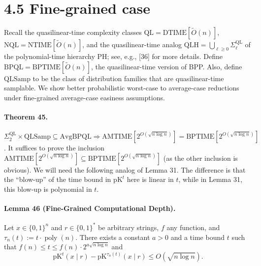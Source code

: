 \documentclass[10pt,a4paper]{article}
\begin{document}
\section*{4.5 Fine-grained case}
Recall the quasilinear-time complexity classes $\mathrm{QL}=\mathrm{DTIME}[\widetilde O(n)]$, $\mathrm{NQL}=\mathrm{NTIME}[\widetilde O(n)]$, and the quasilinear-time analog $\mathrm{QLH}=\bigcup_{\ell\geq0}\Sigma_\ell^{\mathrm{QL}}$ of the polynomial-time hierarchy PH; see, e.g., [36] for more details. Define $\mathrm{BPQL}=\mathrm{BPTIME}[\widetilde O(n)]$, the quasilinear-time version of BPP. Also, define $\mathrm{QLSamp}$ to be the class of distribution families that are quasilinear-time samplable. We show better probabilistic worst-case to average-case reductions under fine-grained average-case easiness assumptions.
\paragraph{Theorem 45.} $\Sigma_2^{\mathrm{QL}}\times\mathrm{QLSamp}\subseteq\mathrm{AvgBPQL}\Longrightarrow\mathrm{AMTIME}[2^{O(\sqrt{n\log n})}]=\mathrm{BPTIME}[2^{O(\sqrt{n\log n})}]$.
It suffices to prove the inclusion $\mathrm{AMTIME}[2^{O(\sqrt{n\log n})}]\subseteq\mathrm{BPTIME}[2^{O(\sqrt{n\log n})}]$ (as the other inclusion is obvious). We will need the following analog of Lemma 31. The difference is that the ``blow-up'' of the time bound in $\mathrm{pK}^t$ here is linear in $t$, while in Lemma 31, this blow-up is polynomial in $t$.
\paragraph{Lemma 46 (Fine-Grained Computational Depth).} Let $x\in\{0,1\}^n$ and $r\in\{0,1\}^*$ be arbitrary strings, $f$ any function, and $\tau_n(t):=t\cdot\operatorname{poly}(n)$. There exists a constant $a>0$ and a time bound $t$ such that $f(n)\leq t\leq f(n)\cdot2^{a\sqrt{n\log n}}$ and
\[\mathrm{pK}^t(x\mid r)-\mathrm{pK}^{\tau_n(t)}(x\mid r)\leq O(\sqrt{n\log n}).\]
\end{document}
